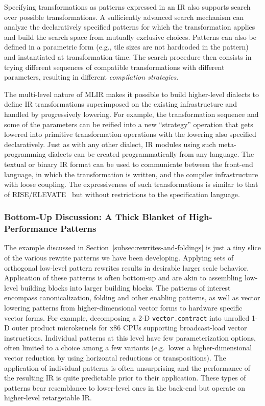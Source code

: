 Specifying transformations as patterns expressed in an IR also supports search over possible transformations.
A sufficiently advanced search mechanism can analyze the declaratively specified patterns for which the transformation applies and build the search space from mutually exclusive choices.
Patterns can also be defined in a parametric form (e.g., tile sizes are not hardcoded in the pattern) and instantiated at transformation time.
The search procedure then consists in trying different sequences of compatible transformations with different parameters, resulting in different \emph{compilation strategies}.

The multi-level nature of MLIR makes it possible to build higher-level dialects to define IR transformations superimposed on the existing infrastructure and handled by progressively lowering.
For example, the transformation sequence and some of the parameters can be reified into a new ``strategy'' operation that gets lowered into primitive transformation operations with the lowering also specified declaratively.
Just as with any other dialect, IR modules using such meta-programming dialects can be created programmatically from any language.
The textual or binary IR format can be used to communicate between the front-end language, in which the transformation is written, and the compiler infrastructure with loose coupling.
The expressiveness of such transformations is similar to that of RISE/ELEVATE~\cite{rise} but without restrictions to the specification language.

\subsubsection{Bottom-Up Discussion: A Thick Blanket of High-Performance Patterns}
The example discussed in Section~\ref{subsec:rewrites-and-foldings} is just a tiny slice of the various rewrite patterns we have been developing.
Applying sets of orthogonal low-level pattern rewrites results in desirable larger scale behavior.
Application of these patterns is often bottom-up and are akin to assembling low-level building blocks into larger building blocks.
The patterns of interest encompass canonicalization, folding and other enabling patterns, as well as vector lowering patterns from higher-dimensional vector forms to hardware specific vector forms. 
For example, decomposing a 2-D \lstinline{vector.contract} into unrolled 1-D outer product microkernels for x86 CPUs supporting broadcast-load vector instructions.
Individual patterns at this level have few parameterization options, often limited to a choice among a few variants (e.g.\ lower a higher-dimensional vector reduction by using horizontal reductions or transpositions).
The application of individual patterns is often unsurprising and the performance of the resulting IR is quite predictable prior to their application.
These types of patterns bear resemblance to lower-level ones in the \LLVM back-end but operate on higher-level retargetable IR.

